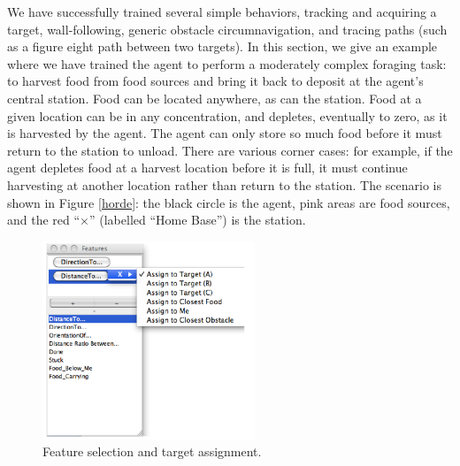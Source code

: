 We have successfully trained several simple behaviors, tracking and acquiring a target, wall-following, generic obstacle circumnavigation, and tracing paths (such as a figure eight path between two targets).  In this section,  we give an example where we have trained the agent to perform a moderately complex foraging task: to harvest food from food sources and bring it back to deposit at the agent's central station.  Food can be located anywhere, as can the station. Food at a given location can be in any concentration, and depletes, eventually to zero, as it is harvested by the agent.  The agent can only store so much food before it must return to the station to unload.  There are various corner cases: for example, if the agent depletes food at a harvest location before it is full, it must continue harvesting at another location rather than return to the station. The scenario is shown in Figure \ref{horde}: the black circle is the agent, pink areas are food sources, and the red ``\(\times\)'' (labelled ``Home Base'') is the station.

\begin{figure}[t]
\begin{center}
\includegraphics[width=2.5in]{Features.pdf}
\end{center}
\caption{Feature selection and target assignment.}
\label{features}
\end{figure}

